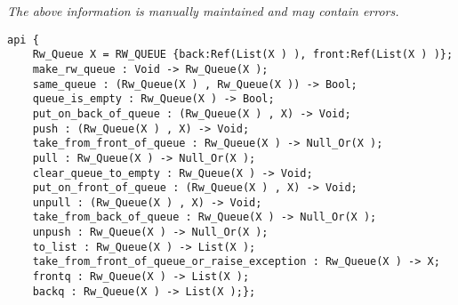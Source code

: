 \label{api:Rw\_Queue}

{\tiny \it The above information is manually maintained and may contain errors.}
\begin{verbatim}
api {
    Rw_Queue X = RW_QUEUE {back:Ref(List(X ) ), front:Ref(List(X ) )};
    make_rw_queue : Void -> Rw_Queue(X );
    same_queue : (Rw_Queue(X ) , Rw_Queue(X )) -> Bool;
    queue_is_empty : Rw_Queue(X ) -> Bool;
    put_on_back_of_queue : (Rw_Queue(X ) , X) -> Void;
    push : (Rw_Queue(X ) , X) -> Void;
    take_from_front_of_queue : Rw_Queue(X ) -> Null_Or(X );
    pull : Rw_Queue(X ) -> Null_Or(X );
    clear_queue_to_empty : Rw_Queue(X ) -> Void;
    put_on_front_of_queue : (Rw_Queue(X ) , X) -> Void;
    unpull : (Rw_Queue(X ) , X) -> Void;
    take_from_back_of_queue : Rw_Queue(X ) -> Null_Or(X );
    unpush : Rw_Queue(X ) -> Null_Or(X );
    to_list : Rw_Queue(X ) -> List(X );
    take_from_front_of_queue_or_raise_exception : Rw_Queue(X ) -> X;
    frontq : Rw_Queue(X ) -> List(X );
    backq : Rw_Queue(X ) -> List(X );};
\end{verbatim}
